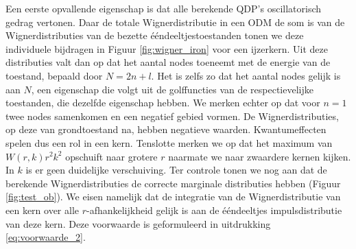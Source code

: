 \documentclass[11pt,twoside]{book}
\begin{document}
Een eerste opvallende eigenschap is dat alle berekende QDP's oscillatorisch gedrag vertonen. Daar de totale Wignerdistributie in een ODM de som is van de Wignerdistributies van de bezette \'{e}\'{e}ndeeltjestoestanden tonen we deze individuele bijdragen in Figuur \ref{fig:wigner_iron} voor een ijzerkern. Uit deze distributies valt dan op dat het aantal nodes toeneemt met de energie van de toestand, bepaald door $N=2n+l$. Het is zelfs zo dat het aantal nodes gelijk is aan $N$, een eigenschap die volgt uit de golffuncties van de respectievelijke toestanden, die dezelfde eigenschap hebben. We merken echter op dat voor $n=1$ twee nodes samenkomen en een negatief gebied vormen.
De Wignerdistributies, op deze van grondtoestand na, hebben negatieve waarden. Kwantumeffecten spelen dus een rol in een kern.
Tenslotte merken we op dat het maximum van $W(r,k)r^2 k^2$ opschuift naar grotere $r$ naarmate we naar zwaardere kernen kijken. In $k$ is er geen duidelijke verschuiving. 
Ter controle tonen we nog aan dat de berekende Wignerdistributies de correcte marginale distributies hebben (Figuur \ref{fig:test_ob}). We eisen namelijk dat de integratie van de  Wignerdistributie van een kern over alle $r$-afhankelijkheid gelijk is aan de \'{e}\'{e}ndeeltjes impulsdistributie van deze kern. Deze voorwaarde is geformuleerd in uitdrukking \eqref{eq:voorwaarde_2}.
\end{document}
